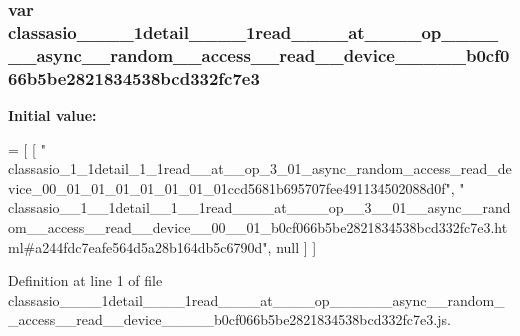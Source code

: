 \subsubsection[{classasio\+\_\+\+\_\+1\+\_\+\+\_\+1detail\+\_\+\+\_\+1\+\_\+\+\_\+1read\+\_\+\+\_\+\+\_\+\+\_\+at\+\_\+\+\_\+\+\_\+\+\_\+op\+\_\+\+\_\+3\+\_\+\+\_\+01\+\_\+\+\_\+async\+\_\+\+\_\+random\+\_\+\+\_\+access\+\_\+\+\_\+read\+\_\+\+\_\+device\+\_\+\+\_\+00\+\_\+\+\_\+01\+\_\+b0cf066b5be2821834538bcd332fc7e3}]{\setlength{\rightskip}{0pt plus 5cm}var classasio\+\_\+\+\_\+\_\+\+\_\+1detail\+\_\+\+\_\+\_\+\+\_\+1read\+\_\+\+\_\+\+\_\+\+\_\+at\+\_\+\+\_\+\+\_\+\+\_\+op\+\_\+\+\_\+\_\+\+\_\+\_\+\+\_\+async\+\_\+\+\_\+random\+\_\+\+\_\+access\+\_\+\+\_\+read\+\_\+\+\_\+device\+\_\+\+\_\+\_\+\+\_\+\_\+b0cf066b5be2821834538bcd332fc7e3}\label{classasio____1____1detail____1____1read________at________op____3____01____async____random____acc216863fee54fc0fefebb2d5d8db2a9d9_a01ee29f3cf10f112eda39ab83ce909e4}
{\bfseries Initial value\+:}
\begin{DoxyCode}
=
[
    [ \textcolor{stringliteral}{"
      classasio\_1\_1detail\_1\_1read\_\_at\_\_op\_3\_01\_async\_random\_access\_read\_device\_00\_01\_01\_01\_01\_01\_01\_01ccd5681b695707fee491134502088d0f"}, \textcolor{stringliteral}{"
      classasio\_\_1\_\_1detail\_\_1\_\_1read\_\_\_\_at\_\_\_\_op\_\_3\_\_01\_\_async\_\_random\_\_access\_\_read\_\_device\_\_00\_\_01\_b0cf066b5be2821834538bcd332fc7e3.html#a244fdc7eafe564d5a28b164db5c6790d"}, null ]
]
\end{DoxyCode}


Definition at line 1 of file classasio\+\_\+\+\_\+\_\+\+\_\+1detail\+\_\+\+\_\+\_\+\+\_\+1read\+\_\+\+\_\+\+\_\+\+\_\+at\+\_\+\+\_\+\+\_\+\+\_\+op\+\_\+\+\_\+\_\+\+\_\+\_\+\+\_\+async\+\_\+\+\_\+random\+\_\+\+\_\+access\+\_\+\+\_\+read\+\_\+\+\_\+device\+\_\+\+\_\+\_\+\+\_\+\_\+b0cf066b5be2821834538bcd332fc7e3.\+js.

